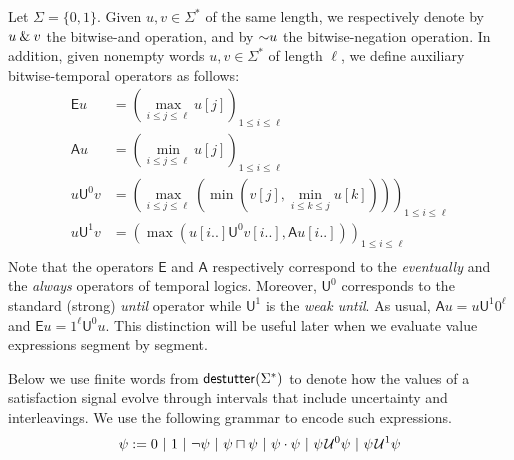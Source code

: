 Let $\Sigma = \{0,1\}$.
Given $u,v \in \Sigma^*$ of the same length, we respectively denote by $u \mathbin{\&} v$ the bitwise-and operation, and by $\mathord{\sim} u$ the bitwise-negation operation.
In addition, given nonempty words $u,v \in \Sigma^*$ of length $\ell$, we define auxiliary bitwise-temporal operators as follows:
\begin{align*}
\mathsf{E} u &= \left( \max_{i \leq j \leq \ell} u[j] \right)_{1 \leq i \leq \ell} \\
\mathsf{A} u &= \left( \min_{i \leq j \leq \ell} u[j] \right)_{1 \leq i \leq \ell} \\
u \mathsf{U}^0 v &= \left( \max_{i \leq j \leq \ell} \left( \min \left( v[j], \min_{i \leq k \leq j} u[k] \right) \right) \right)_{1 \leq i \leq \ell} \\
u \mathsf{U}^1 v &= \left( \max \left( u[i..] \mathsf{U}^0 v[i..], \mathsf{A} u[i..] \right) \right)_{1 \leq i \leq \ell} \\
\end{align*}
Note that the operators $\mathsf{E}$ and $\mathsf{A}$ respectively correspond to the \emph{eventually} and the \emph{always} operators of temporal logics.
Moreover, $\mathsf{U}^0$ corresponds to the standard (strong) \emph{until} operator while $\mathsf{U}^1$ is the \emph{weak until}.
As usual, $\mathsf{A} u = u \mathsf{U}^1 0^\ell$ and $\mathsf{E} u = 1^\ell \mathsf{U}^0 u$.
This distinction will be useful later when we evaluate value expressions segment by segment.

Below we use finite words from $\mathsf{destutter}(\Sigma^*)$ to denote how the values of a satisfaction signal evolve through intervals that include uncertainty and interleavings.
We use the following grammar to encode such expressions.
$$ \psi := 0 ~|~ 1 ~|~ \lnot \psi  ~|~ \psi \sqcap \psi ~|~ \psi \cdot \psi ~|~ \psi \kern.1em\mathcal{U}^0 \psi ~|~ \psi \kern.1em\mathcal{U}^1 \psi $$ %


